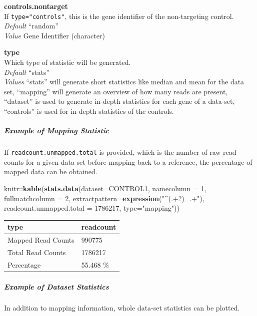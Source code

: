\documentclass[]{article}
\newenvironment{Shaded}{\begin{snugshade}}{\end{snugshade}}
\newcommand{\KeywordTok}[1]{\textcolor[rgb]{0.13,0.29,0.53}{\textbf{{#1}}}}
\newcommand{\DataTypeTok}[1]{\textcolor[rgb]{0.13,0.29,0.53}{{#1}}}
\newcommand{\DecValTok}[1]{\textcolor[rgb]{0.00,0.00,0.81}{{#1}}}
\newcommand{\StringTok}[1]{\textcolor[rgb]{0.31,0.60,0.02}{{#1}}}
\newcommand{\NormalTok}[1]{{#1}}
\let\oldsubparagraph\subparagraph
\renewcommand{\subparagraph}[1]{\oldsubparagraph{#1}\mbox{}}
\begin{document}
\textbf{controls.nontarget}\\
If \texttt{type="controls"}, this is the gene identifier of the
non-targeting control.\\
\emph{Default} ``random''\\
\emph{Value} Gene Identifier (character)

\textbf{type}\\
Which type of statistic will be generated.\\
\emph{Default} ``stats''\\
\emph{Values} ``stats'' will generate short statistics like median and
mean for the data set, ``mapping'' will generate an overview of how many
reads are present, ``dataset'' is used to generate in-depth statistics
for each gene of a data-set, ``controls'' is used for in-depth
statistics of the controls.

\subparagraph{Example of Mapping
Statistic}\label{example-of-mapping-statistic}

If \texttt{readcount.unmapped.total} is provided, which is the number of
raw read counts for a given data-set before mapping back to a reference,
the percentage of mapped data can be obtained.

\begin{Shaded}
\begin{Highlighting}[]
\NormalTok{knitr::}\KeywordTok{kable}\NormalTok{(}\KeywordTok{stats.data}\NormalTok{(}\DataTypeTok{dataset=}\NormalTok{CONTROL1, }\DataTypeTok{namecolumn =} \DecValTok{1}\NormalTok{, }\DataTypeTok{fullmatchcolumn =} \DecValTok{2}\NormalTok{,}
  \DataTypeTok{extractpattern=}\KeywordTok{expression}\NormalTok{(}\StringTok{"^(.+?)_.+"}\NormalTok{), }\DataTypeTok{readcount.unmapped.total =} \DecValTok{1786217}\NormalTok{, }\DataTypeTok{type=}\StringTok{"mapping"}\NormalTok{))}
\end{Highlighting}
\end{Shaded}

\begin{longtable}[c]{@{}ll@{}}
\toprule
type & readcount\tabularnewline
\midrule
\endhead
Mapped Read Counts & 990775\tabularnewline
Total Read Counts & 1786217\tabularnewline
Percentage & 55.468 \%\tabularnewline
\bottomrule
\end{longtable}

\subparagraph{Example of Dataset
Statistics}\label{example-of-dataset-statistics}

In addition to mapping information, whole data-set statistics can be
plotted.
\end{document}
